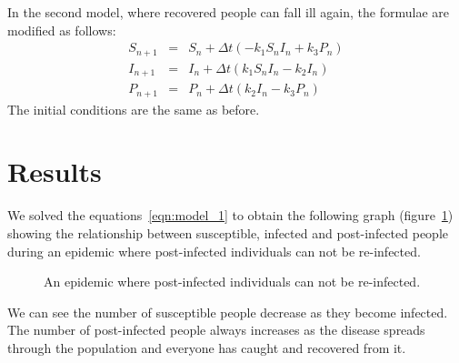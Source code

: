 \documentclass[a4paper,11pt]{article}
\begin{document}
In the second model, where recovered people can fall ill again, the formulae are modified as follows:
\begin{eqnarray}
S_{n+1} &=& S_n + \Delta t(-k_1 S_n I_n + k_3 P_n)  \nonumber \\
I_{n+1} &=& I_n + \Delta t(k_1 S_n I_n - k_2 I_n)  \nonumber \\
P_{n+1} &=& P_n + \Delta t(k_2 I_n - k_3 P_n) 
\end{eqnarray}
The initial conditions are the same as before.

\section{Results}
We solved the equations~\ref{eqn:model_1} to obtain the following graph (figure~\ref{fig:noreinfection})
showing the relationship between susceptible, infected and post-infected people
during an epidemic where post-infected individuals can not be re-infected.
\begin{figure}[h!]
   \centering
{}
\caption{An epidemic where post-infected individuals can not be re-infected.}
\label{fig:noreinfection}
\end{figure}
We can see the number of susceptible people decrease as they become infected. The number 
of post-infected people always increases as the disease spreads through the population
and everyone has caught and recovered from it.
\end{document}
